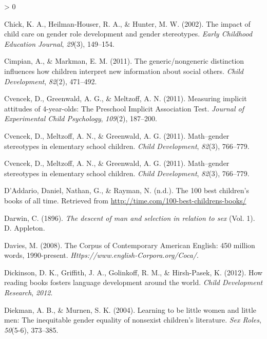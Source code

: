 \documentclass[
  english,
  ,man,floatsintext]{apa6}
\newlength{\cslhangindent}
\newenvironment{CSLReferences}[2] %
 {%
  \setlength{\parindent}{0pt}
  \ifodd #1 \everypar{\setlength{\hangindent}{\cslhangindent}}\ignorespaces\fi
  \ifnum #2 > 0
  \setlength{\parskip}{#2\baselineskip}
  \fi
 }%
 {}
\begin{document}
\begin{CSLReferences}{1}{0}
\leavevmode\hypertarget{ref-chick2002impact}{}%
Chick, K. A., Heilman-Houser, R. A., \& Hunter, M. W. (2002). The impact of child care on gender role development and gender stereotypes. \emph{Early Childhood Education Journal}, \emph{29}(3), 149--154.

\leavevmode\hypertarget{ref-cimpian2011generic}{}%
Cimpian, A., \& Markman, E. M. (2011). The generic/nongeneric distinction influences how children interpret new information about social others. \emph{Child Development}, \emph{82}(2), 471--492.

\leavevmode\hypertarget{ref-cvencek2011measuring}{}%
Cvencek, D., Greenwald, A. G., \& Meltzoff, A. N. (2011). Measuring implicit attitudes of 4-year-olds: The {Preschool Implicit Association Test}. \emph{Journal of Experimental Child Psychology}, \emph{109}(2), 187--200.

\leavevmode\hypertarget{ref-cvencek2011math}{}%
Cvencek, D., Meltzoff, A. N., \& Greenwald, A. G. (2011). Math--gender stereotypes in elementary school children. \emph{Child Development}, \emph{82}(3), 766--779.

\leavevmode\hypertarget{ref-cvencek2011math}{}%
Cvencek, D., Meltzoff, A. N., \& Greenwald, A. G. (2011). Math--gender stereotypes in elementary school children. \emph{Child Development}, \emph{82}(3), 766--779.

\leavevmode\hypertarget{ref-time_100_kidbooks}{}%
D'Addario, Daniel, Nathan, G., \& Rayman, N. (n.d.). The 100 best children's books of all time. Retrieved from \url{http://time.com/100-best-childrens-books/}

\leavevmode\hypertarget{ref-darwin1896descent}{}%
Darwin, C. (1896). \emph{The descent of man and selection in relation to sex} (Vol. 1). D. Appleton.

\leavevmode\hypertarget{ref-davies2008corpus}{}%
Davies, M. (2008). The {C}orpus of {C}ontemporary {A}merican {E}nglish: 450 million words, 1990-present. \emph{{H}ttps://{w}ww.english-Corpora.org/Coca/}.

\leavevmode\hypertarget{ref-dickinson2012reading}{}%
Dickinson, D. K., Griffith, J. A., Golinkoff, R. M., \& Hirsh-Pasek, K. (2012). How reading books fosters language development around the world. \emph{Child Development Research}, \emph{2012}.

\leavevmode\hypertarget{ref-diekman2004learning}{}%
Diekman, A. B., \& Murnen, S. K. (2004). Learning to be little women and little men: The inequitable gender equality of nonsexist children's literature. \emph{Sex Roles}, \emph{50}(5-6), 373--385.


\end{CSLReferences}
\end{document}

